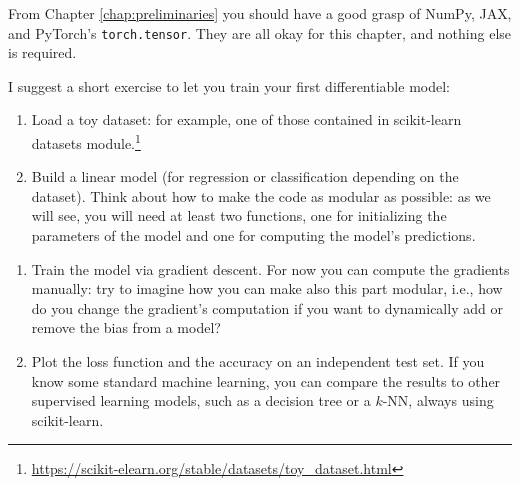From Chapter \ref{chap:preliminaries} you should have a good grasp of NumPy, JAX, and PyTorch's \texttt{torch.tensor}. They are all okay for this chapter, and nothing else is required.

I suggest a short exercise to let you train your first differentiable model:

\begin{enumerate}
\item Load a toy dataset: for example, one of those contained in scikit-learn datasets module.\footnote{\url{https://scikit-elearn.org/stable/datasets/toy_dataset.html}}
\item Build a linear model (for regression or classification depending on the dataset). Think about how to make the code as modular as possible: as we will see, you will need at least two functions, one for initializing the parameters of the model and one for computing the model's predictions.
\end{enumerate}

\begin{enumerate}\addtocounter{enumi}{2}
\item Train the model via gradient descent. For now you can compute the gradients manually: try to imagine how you can make also this part modular, i.e., how do you change the gradient's computation if you want to dynamically add or remove the bias from a model?
\item Plot the loss function and the accuracy on an independent test set. If you know some standard machine learning, you can compare the results to other supervised learning models, such as a decision tree or a $k$-NN, always using scikit-learn.
\end{enumerate}